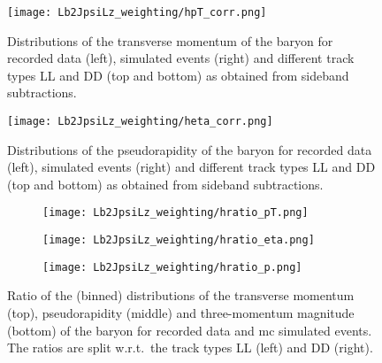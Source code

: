 \begin{figure}[htbp]
    \centering
    \texttt{[image: Lb2JpsiLz\_weighting/hpT\_corr.png]}
    \caption{Distributions of the transverse momentum of the \Lb baryon for recorded data (left), simulated events (right) and different track types \gls{LL} and \gls{DD} (top and bottom) as obtained from sideband subtractions.}
    \label{fig:LbToJpsiLz_hpT_corr}
\end{figure}

\begin{figure}[htbp]
    \centering
    \texttt{[image: Lb2JpsiLz\_weighting/heta\_corr.png]}
    \caption{Distributions of the pseudorapidity of the \Lb baryon for recorded data (left), simulated events (right) and different track types \gls{LL} and \gls{DD} (top and bottom) as obtained from sideband subtractions.}
    \label{fig:LbToJpsiLz_heta_corr}
\end{figure}

\begin{figure}[htbp]
    \centering
    \begin{subfigure}{\textwidth}
        \centering
        \texttt{[image: Lb2JpsiLz\_weighting/hratio\_pT.png]}
    \end{subfigure}
    \par\bigskip 
    \begin{subfigure}{\textwidth}
        \centering
        \texttt{[image: Lb2JpsiLz\_weighting/hratio\_eta.png]}
    \end{subfigure}
    \par\bigskip 
    \begin{subfigure}{\textwidth}
        \centering
        \texttt{[image: Lb2JpsiLz\_weighting/hratio\_p.png]}
    \end{subfigure}
    \par\bigskip 
    \caption{Ratio of the (binned) distributions of the transverse momentum (top), pseudorapidity (middle) and three-momentum magnitude (bottom) of the \Lb baryon for recorded data and \gls{mc} simulated events. The ratios are split w.r.t.\ the track types \gls{LL} (left) and \gls{DD} (right).}
    \label{fig:LbToJpsiLz_hratio}
\end{figure}


